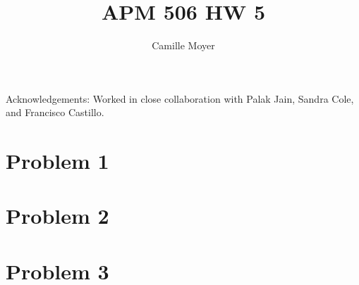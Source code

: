 




\usepackage{amssymb}
\usepackage{amsmath}
\usepackage{mathtools}
\usepackage{color}
\usepackage{float}
\usepackage[final]{graphicx}
\usepackage{subfig}


\sloppy
{}
\setlength{\parindent}{0pt}



\title{APM 506 HW 5}
\author{Camille Moyer}
\maketitle


Acknowledgements: Worked in close collaboration with Palak Jain, Sandra Cole, and Francisco Castillo.



\section*{Problem 1}


\section*{Problem 2}


\section*{Problem 3}


